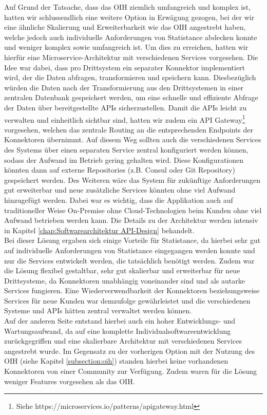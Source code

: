 Auf Grund der Tatsache, dass das OIH ziemlich umfangreich und komplex ist, hatten wir schlussendlich eine weitere Option in Erwägung gezogen, bei der wir eine ähnliche Skalierung und Erweiterbarkeit wie das OIH angestrebt haben, welche jedoch auch individuelle Anforderungen von Statistance abdecken konnte und weniger komplex sowie umfangreich ist. Um dies zu erreichen, hatten wir hierfür eine Microservice-Architektur mit verschiedenen Services vorgesehen. Die Idee war dabei, dass pro Drittsystem ein separater Konnektor implementiert wird, der die Daten abfragen, transformieren und speichern kann. Diesbezüglich würden die Daten nach der Transformierung aus den Drittsystemen in einer zentralen Datenbank gespeichert werden, um eine schnelle und effiziente Abfrage der Daten über bereitgestellte APIs sicherzustellen. Damit die APIs leicht zu verwalten und einheitlich sichtbar sind, hatten wir zudem ein API Gateway\footnote{Siehe https://microservices.io/patterns/apigateway.html} vorgesehen, welchen das zentrale Routing an die entsprechenden Endpoints der Konnektoren übernimmt. Auf diesem Weg sollten auch die verschiedenen Services des Systems über einen separaten Service zentral konfiguriert werden können, sodass der Aufwand im Betrieb gering gehalten wird. Diese Konfigurationen könnten dann auf externe Repositories (z.B. Consul oder Git Repository) gespeichert werden. Des Weiteren wäre das System für zukünftige Anforderungen gut erweiterbar und neue zusätzliche Services könnten ohne viel Aufwand hinzugefügt werden. Dabei war es wichtig, dass die Applikation auch auf traditioneller Weise On-Premise ohne Cloud-Technologien beim Kunden ohne viel Aufwand betrieben werden kann. Die Details zu der Architektur werden intensiv in Kapitel \ref{chap:Softwarearchitektur API-Design} behandelt. \\
Bei dieser Lösung ergaben sich einige Vorteile für Statistance, da hierbei sehr gut auf individuelle Anforderungen von Statistance eingegangen werden konnte und nur die Services entwickelt werden, die tatsächlich benötigt werden. Zudem war die Lösung flexibel gestaltbar, sehr gut skalierbar und erweiterbar für neue Drittsysteme, da Konnektoren unabhängig voneinander sind und als autarke Services fungieren. Eine Wiederverwendbarkeit der Konnektoren beziehungsweise Services für neue Kunden war demzufolge gewährleistet und die verschiedenen Systeme und APIs hätten zentral verwaltet werden können. \\
Auf der anderen Seite entstand hierbei auch ein hoher Entwicklungs- und Wartungsaufwand, da auf eine komplette Individualsoftwareentwicklung zurückgegriffen und eine skalierbare Architektur mit verschiedenen Services angestrebt wurde. Im Gegensatz zu der vorherigen Option mit der Nutzung des OIH (siehe Kapitel \ref{subsection:oih}) standen hierbei keine vorhandenen Konnektoren von einer Community zur Verfügung. Zudem waren für die Lösung weniger Features vorgesehen als das OIH.